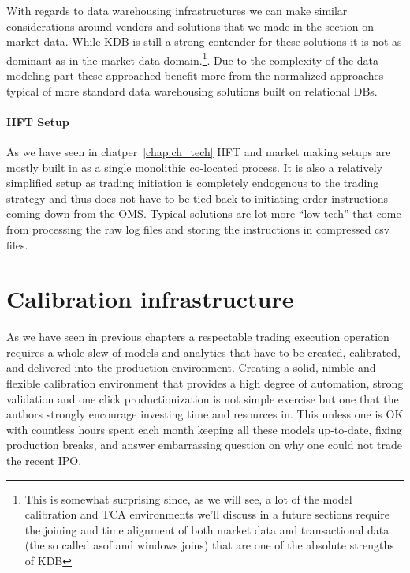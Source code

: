 With regards to data warehousing infrastructures we can make similar considerations around vendors and solutions that we made in the section on market data. While KDB is still a strong contender for these solutions it is not as dominant as in the market data domain.\footnote{This is somewhat surprising since, as we will see, a lot of the model calibration and TCA environments we'll discuss in a future sections require the joining and time alignment of both market data and transactional data (the so called asof and windows joins) that are one of the absolute strengths of KDB}. Due to the  complexity of the data modeling part these approached benefit more from the normalized approaches typical of more standard data warehousing solutions built on relational DBs. 


\paragraph{HFT Setup}

As we have seen in chatper~\ref{chap:ch_tech} HFT and market making setups are mostly built in as a single monolithic co-located process. It is also a relatively simplified setup as trading initiation is completely endogenous to the trading strategy and thus does not have to be tied back to initiating order instructions coming down from the OMS. Typical solutions are  lot more ``low-tech'' that come from processing the raw log files and storing the instructions in compressed csv files.



\section{Calibration infrastructure}


As we have seen in previous chapters a respectable trading execution operation requires a whole slew of models and analytics that have to be created, calibrated, and delivered into the production environment. Creating a solid, nimble and flexible calibration environment that provides a high degree of automation, strong validation and one click productionization is not  simple exercise but one that the authors strongly encourage investing time and resources in. This unless one is OK with countless hours spent each month keeping all these models up-to-date, fixing production breaks, and answer embarrassing question on why one could not trade the recent IPO. 


